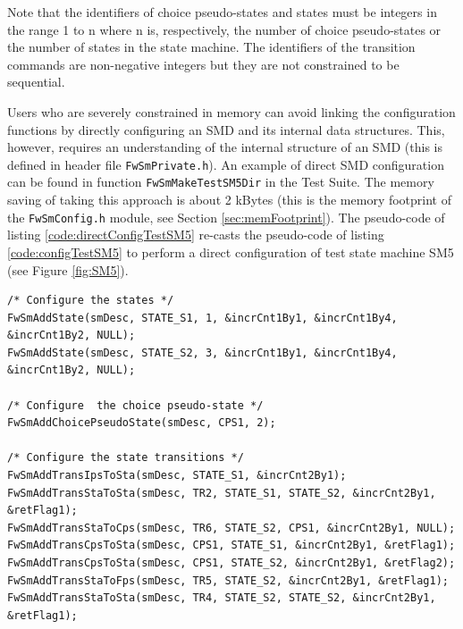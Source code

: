 \documentclass[a4paper,10pt]{article}
\begin{document}
Note that the identifiers of choice pseudo-states and states must be integers in the range 1 to n where n is,
respectively, the number of choice pseudo-states or the number of states in the state machine. 
The identifiers of the transition commands are non-negative integers but they are not constrained to
be sequential.

Users who are severely constrained in memory can avoid linking the configuration functions by directly 
configuring an SMD and its internal data structures. This, however, requires an understanding of the internal 
structure of an SMD (this is defined in header file \texttt{FwSmPrivate.h}). An example of direct SMD 
configuration can be found in function \texttt{FwSmMakeTestSM5Dir} in the Test Suite. The memory saving of 
taking this approach is about 2 kBytes (this is the memory footprint of the \texttt{FwSmConfig.h} module, 
see Section \ref{sec:memFootprint}). The pseudo-code of listing \ref{code:directConfigTestSM5}
re-casts the pseudo-code of listing \ref{code:configTestSM5} to perform a direct configuration of test 
state machine SM5 (see Figure \ref{fig:SM5}). 

\begin{lstlisting}
/* Configure the states */
FwSmAddState(smDesc, STATE_S1, 1, &incrCnt1By1, &incrCnt1By4, &incrCnt1By2, NULL);
FwSmAddState(smDesc, STATE_S2, 3, &incrCnt1By1, &incrCnt1By4, &incrCnt1By2, NULL);

/* Configure  the choice pseudo-state */
FwSmAddChoicePseudoState(smDesc, CPS1, 2);

/* Configure the state transitions */
FwSmAddTransIpsToSta(smDesc, STATE_S1, &incrCnt2By1);
FwSmAddTransStaToSta(smDesc, TR2, STATE_S1, STATE_S2, &incrCnt2By1, &retFlag1);
FwSmAddTransStaToCps(smDesc, TR6, STATE_S2, CPS1, &incrCnt2By1, NULL);
FwSmAddTransCpsToSta(smDesc, CPS1, STATE_S1, &incrCnt2By1, &retFlag1);
FwSmAddTransCpsToSta(smDesc, CPS1, STATE_S2, &incrCnt2By1, &retFlag2);
FwSmAddTransStaToFps(smDesc, TR5, STATE_S2, &incrCnt2By1, &retFlag1);
FwSmAddTransStaToSta(smDesc, TR4, STATE_S2, STATE_S2, &incrCnt2By1, &retFlag1);
\end{lstlisting}
\end{document}
